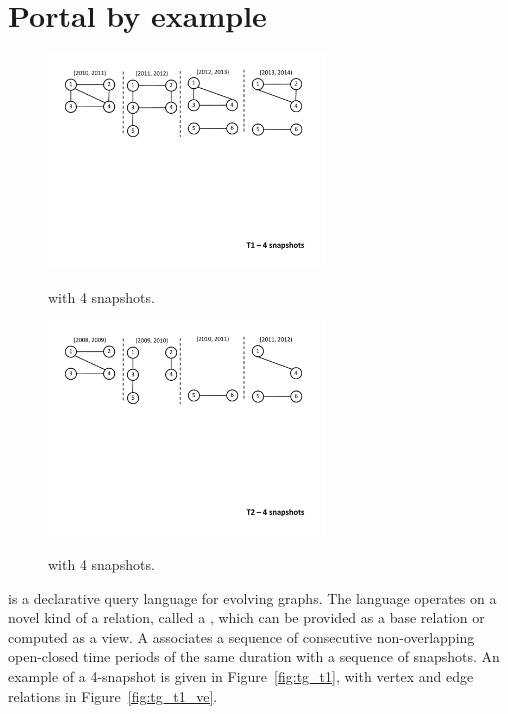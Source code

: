 \section{Portal by example}
\label{sec:language}

\begin{figure}[th!]
\centering
\begin{minipage}{3.2in}
  \includegraphics[width=2.9in]{figs/4snaps_T1.pdf}
  \caption{\tg {} with 4 snapshots.}{}
  \label{fig:tg_t1}
\end{minipage}%
\begin{minipage}{3.2in}
  \includegraphics[width=2.9in]{figs/4snaps_T2.pdf}
  \caption{\tg {} with 4 snapshots.}{}
  \label{fig:tg_t2}
\end{minipage}
\end{figure}

\ql is a declarative query language for evolving graphs.  The language
operates on a novel kind of a relation, called a \tg, which can be
provided as a base relation or computed as a view.  A \tg associates a
sequence of consecutive non-overlapping open-closed time periods of
the same duration with a sequence of snapshots.  An example of a
4-snapshot \tg is given in Figure~\ref{fig:tg_t1}, with vertex and
edge relations in Figure~\ref{fig:tg_t1_ve}.


